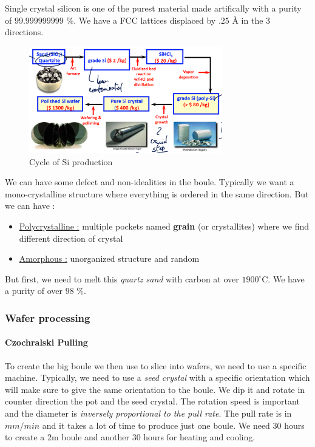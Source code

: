 \documentclass[
]{article}
\begin{document}
Single crystal silicon is one of the purest material made artifically
with a purity of \(99.999999999\) \%. We have a FCC lattices displaced
by \(.25\) Å in the 3 directions.

\begin{figure}
\hypertarget{fig:si-production-label}{%
\centering
\includegraphics[width=0.75\textwidth,height=\textheight]{cycle_si.png}
\caption{Cycle of Si production}\label{fig:si-production-label}
}
\end{figure}

We can have some defect and non-idealities in the boule. Typically we
want a mono-crystalline structure where everything is ordered in the
same direction. But we can have :

\begin{itemize}
\item
  \ul{Polycrystalline :} multiple pockets named \textbf{grain} (or
  crystallites) where we find different direction of crystal
\item
  \ul{Amorphous :} unorganized structure and random
\end{itemize}

But first, we need to melt this \emph{quartz sand} with carbon at over
\(1900^\circ\)C. We have a purity of over \(98\) \%.

\hypertarget{wafer-processing}{%
\subsubsection{Wafer processing}\label{wafer-processing}}

\hypertarget{czochralski-pulling}{%
\paragraph{Czochralski Pulling}\label{czochralski-pulling}}

To create the big boule we then use to slice into wafers, we need to use
a specific machine. Typically, we need to use a \emph{seed crystal} with
a specific orientation which will make sure to give the same orientation
to the boule. We dip it and rotate in counter direction the pot and the
seed crystal. The rotation speed is important and the diameter is
\emph{inversely proportional to the pull rate}. The pull rate is in
\(mm/min\) and it takes a lot of time to produce just one boule. We need
30 hours to create a 2m boule and another 30 hours for heating and
cooling.\\
\end{document}
